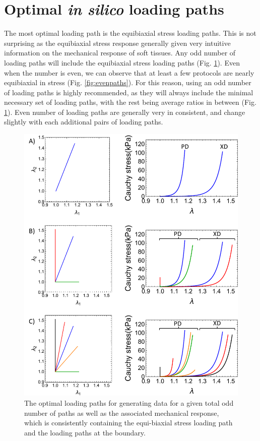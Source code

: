 \section{Optimal \textit{in silico} loading paths} \label{sec:optimalpaths}

	The most optimal loading path is the equibiaxial stress loading paths. This is not surprising as the equibiaxial stress response generally given very intuitive information on the mechanical response of soft tissues. Any odd number of loading paths will include the equibiaxial stress loading paths (Fig. \ref{fig:oddpaths}). Even when the number is even, we can observe that at least a few protocols are nearly equibiaxial in stress (Fig. \ref{fig:evenpaths}). For this reason, using an odd number of loading paths is highly recommended, as they will always include the minimal necessary set of loading paths, with the rest being average ratios in between (Fig. \ref{fig:oddpaths}). Even number of loading paths are generally very in consistent, and change slightly with each additional pairs of loading paths.  

\begin{figure}
\centering
\includegraphics[width=5.5in]{Images/chapter5/oddpaths}
\caption{The optimal loading paths for generating data for a given total odd number of paths as well as the associated mechanical response, which is consistently containing the equi-biaxial stress loading path and the loading paths at the boundary.}
\label{fig:oddpaths}
\end{figure} 


